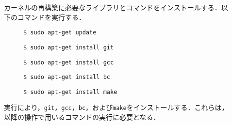 \documentclass[12pt]{jsarticle}
\begin{document}
\begin{description}
\item[] カーネルの再構築に必要なライブラリとコマンドをインストールする．以下のコマンドを実行する．
  \begin{description}
  \item[] \verb|$ sudo apt-get update|
  \item[] \verb|$ sudo apt-get install git|
  \item[] \verb|$ sudo apt-get install gcc|
  \item[] \verb|$ sudo apt-get install bc |
  \item[] \verb|$ sudo apt-get install make|
  \end{description}
\item[] 実行により，\verb|git|，\verb|gcc|，\verb|bc|，および\verb|make|をインストールする．これらは，以降の操作で用いるコマンドの実行に必要となる．
\end{description}
\end{document}
